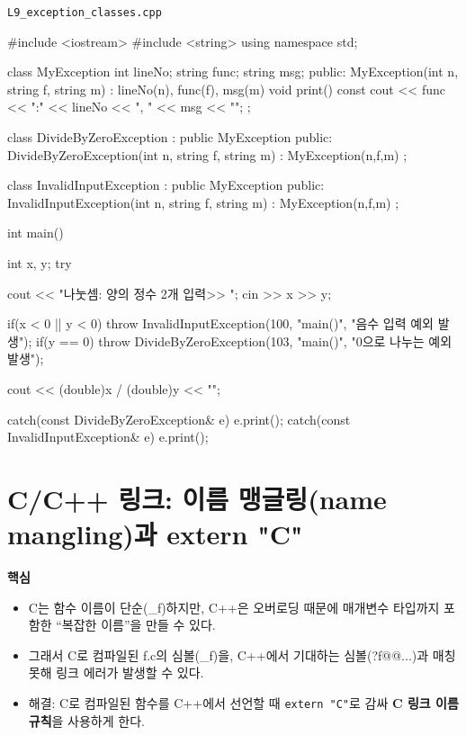 \documentclass[11pt,a4paper]{article}
\newcommand{\filetag}[1]{\texttt{\color{Accent}#1}}
\begin{document}
\noindent\filetag{L9\_exception\_classes.cpp}
\begin{cppcode}
#include <iostream>
#include <string>
using namespace std;

class MyException {
    int lineNo;
    string func;
    string msg;
public:
    MyException(int n, string f, string m) : lineNo(n), func(f), msg(m) {}
    void print() const { cout << func << ":" << lineNo << ", " << msg << "\n"; }
};

class DivideByZeroException : public MyException {
public:
    DivideByZeroException(int n, string f, string m) : MyException(n,f,m) {}
};

class InvalidInputException : public MyException {
public:
    InvalidInputException(int n, string f, string m) : MyException(n,f,m) {}
};

int main() {
    int x, y;
    try {
        cout << "나눗셈: 양의 정수 2개 입력>> ";
        cin >> x >> y;

        if(x < 0 || y < 0)
            throw InvalidInputException(100, "main()", "음수 입력 예외 발생");
        if(y == 0)
            throw DivideByZeroException(103, "main()", "0으로 나누는 예외 발생");

        cout << (double)x / (double)y << "\n";
    }
    catch(const DivideByZeroException& e) { e.print(); }
    catch(const InvalidInputException& e)  { e.print(); }
}
\end{cppcode}

\section{C/C++ 링크: 이름 맹글링(name mangling)과 extern "C"}
\begin{GoalBox}
\textbf{핵심}
\begin{itemize}[leftmargin=18pt]
  \item C는 함수 이름이 단순(\_f)하지만, C++은 오버로딩 때문에 매개변수 타입까지 포함한 ``복잡한 이름''을 만들 수 있다.
  \item 그래서 C로 컴파일된 f.c의 심볼(\_f)을, C++에서 기대하는 심볼(?f@@...)과 매칭 못해 링크 에러가 발생할 수 있다.
  \item 해결: C로 컴파일된 함수를 C++에서 선언할 때 \texttt{extern "C"}로 감싸 \textbf{C 링크 이름 규칙}을 사용하게 한다.
\end{itemize}
\end{GoalBox}
\end{document}
